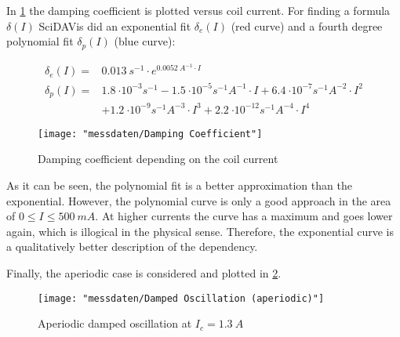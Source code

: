             In \cref{fig:damping-coefficient} the damping coefficient is plotted versus coil current. For finding a formula
            \(\delta(I)\) SciDAVis did an exponential fit \(\delta_e(I)\) (red curve) and a fourth degree polynomial fit
            \(\delta_p(I)\) (blue curve):\par
            \begin{align}
                \delta_e(I)=&\SI{0.013}{s^{-1}}\cdot e^{\SI{0.0052}{A^{-1}}\cdot I}\\
                \delta_p(I)=&\SI{1.8}{\cdot 10^{-3}s^{-1}} - \SI{1.5}{\cdot 10^{-5}s^{-1}A^{-1}}\cdot I + \SI{6.4}{\cdot 10^{-7}s^{-1}A^{-2}}\cdot I^2 \nonumber\\
                            &+ \SI{1.2}{\cdot 10^{-9}s^{-1}A^{-3}}\cdot I^3 + \SI{2.2}{\cdot 10^{-12}s^{-1}A^{-4}}\cdot I^4
            \end{align}
            \begin{figure}
                \centering
                \texttt{[image: "messdaten/Damping Coefficient"]}
                \caption[Damping coefficient depending on the coil current]{Damping coefficient depending on the coil current}
                \label{fig:damping-coefficient}
            \end{figure}
            As it can be seen, the polynomial fit is a better approximation than the exponential. However, the polynomial curve
            is only a good approach in the area of \(0 \leq I \leq \SI{500}{mA}\). At higher currents the curve has a maximum
            and goes lower again, which is illogical in the physical sense. Therefore, the exponential curve is a qualitatively
            better description of the dependency.\par\medskip
            Finally, the aperiodic case is considered and plotted in \cref{fig:damped-oscillation-aperiodic}.\par
            \begin{figure}
                \centering
                \texttt{[image: "messdaten/Damped Oscillation (aperiodic)"]}
                \caption[Aperiodic damped oscillation at \(I_c=\SI{1.3}{A}\)]{Aperiodic damped oscillation at \(I_c=\SI{1.3}{A}\)}
                \label{fig:damped-oscillation-aperiodic}
            \end{figure}
